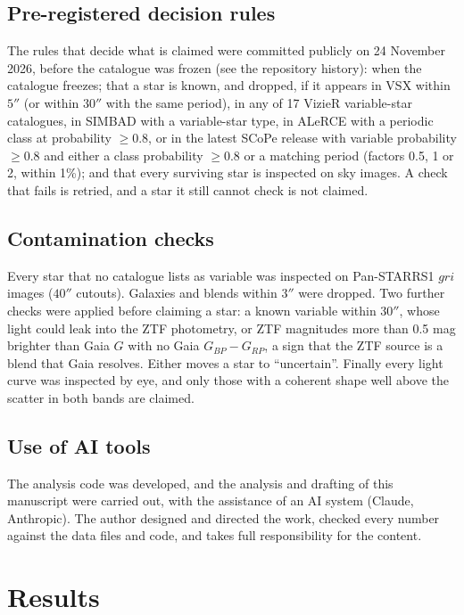 \documentclass[twocolumn]{searchchev_preprint}
\begin{document}
\subsection{Pre-registered decision rules}
The rules that decide what is claimed were committed publicly on 24 November 2026, before the catalogue was frozen
(see the repository history): when the catalogue freezes; that a star is known, and dropped, if it appears
in VSX \citep{Watson2006} within $5''$ (or within $30''$ with the same period), in any of 17 VizieR variable-star
catalogues, in SIMBAD with a variable-star type, in ALeRCE \citep{SanchezSaez2021} with a periodic class at probability
$\ge0.8$, or in the latest SCoPe release \citep{Healy2024} with variable probability $\ge0.8$ and either a class
probability $\ge0.8$ or a matching period (factors 0.5, 1 or 2, within 1\%); and that every surviving star is inspected on
sky images. A check that fails is retried, and a star it still cannot check is not claimed.

\subsection{Contamination checks}
Every star that no catalogue lists as variable was inspected on Pan-STARRS1 \citep{Chambers2016} $gri$ images
($40''$ cutouts). Galaxies and blends within $3''$ were dropped. Two further checks were applied before claiming a star:
a known variable within $30''$, whose light could leak into the ZTF photometry, or ZTF magnitudes more than 0.5 mag
brighter than Gaia $G$ with no Gaia $G_{BP}-G_{RP}$, a sign that the ZTF source is a blend that Gaia resolves. Either
moves a star to ``uncertain''. Finally every light curve was inspected by eye, and only those with a coherent shape
well above the scatter in both bands are claimed.

\subsection{Use of AI tools}
The analysis code was developed, and the analysis and drafting of this manuscript were carried out, with the
assistance of an AI system (Claude, Anthropic). The author designed and directed the work, checked every number
against the data files and code, and takes full responsibility for the content.

\section{Results}
\end{document}
